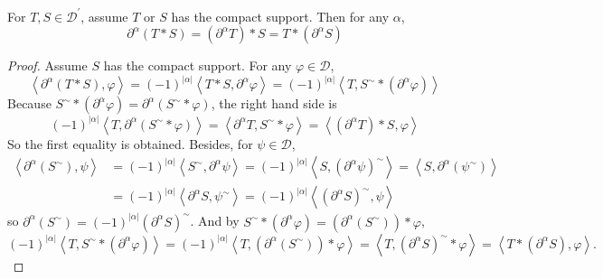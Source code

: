 \begin{enumerate}[label=\arabic*.]
	\begin{prop}
		For $T,S \in \mathcal{D}^\prime$, assume $T$ or $S$ has the compact support. Then for any $\alpha$,
		\begin{equation*}
			\partial^\alpha(T * S)=\left(\partial^\alpha T\right) * S=T *\left(\partial^\alpha S\right)
		\end{equation*}
	\end{prop}
	\begin{proof}
		Assume $S$ has the compact support. For any $\varphi \in \mathcal{D}$,
		\begin{equation*}
			\left\langle\partial^\alpha(T * S), \varphi\right\rangle=(-1)^{|\alpha|}\left\langle T * S, \partial^\alpha \varphi\right\rangle=(-1)^{|\alpha|}\left\langle T, S^{\sim} *\left(\partial^\alpha \varphi\right)\right\rangle
		\end{equation*}
		Because $S^{\sim} *\left(\partial^\alpha \varphi\right)=\partial^\alpha\left(S^{\sim} * \varphi\right)$, the right hand side is
		\begin{equation*}
			(-1)^{|\alpha|}\left\langle T, \partial^\alpha\left(S^{\sim} * \varphi\right)\right\rangle=\left\langle\partial^\alpha T, S^{\sim} * \varphi\right\rangle=\left\langle\left(\partial^\alpha T\right) * S, \varphi\right\rangle
		\end{equation*}
		So the first equality is obtained. Besides, for $\psi \in \mathcal{D}$,
		\begin{equation*}
			\begin{aligned}
				\left\langle\partial^\alpha\left(S^{\sim}\right), \psi\right\rangle & =(-1)^{|\alpha|}\left\langle S^{\sim}, \partial^\alpha \psi\right\rangle=(-1)^{|\alpha|}\left\langle S,\left(\partial^\alpha \psi\right)^{\sim}\right\rangle=\left\langle S, \partial^\alpha\left(\psi^{\sim}\right)\right\rangle \\
				& =(-1)^{|\alpha|}\left\langle\partial^\alpha S, \psi^{\sim}\right\rangle=(-1)^{|\alpha|}\left\langle\left(\partial^\alpha S\right)^{\sim}, \psi\right\rangle
			\end{aligned}
		\end{equation*}
		so $\partial^\alpha\left(S^{\sim}\right)=(-1)^{|\alpha|}\left(\partial^\alpha S\right)^{\sim}$. And by $S^{\sim} *\left(\partial^\alpha \varphi\right)=\left(\partial^\alpha\left(S^{\sim}\right)\right) * \varphi$, 
		\begin{equation*}
			(-1)^{|\alpha|}\left\langle T, S^{\sim} *\left(\partial^\alpha \varphi\right)\right\rangle= (-1)^{|\alpha|}\left\langle T,\left(\partial^\alpha\left(S^{\sim}\right)\right) * \varphi\right\rangle=\left\langle T,\left(\partial^\alpha S\right)^{\sim} * \varphi\right\rangle=\left\langle T *\left(\partial^\alpha S\right), \varphi\right\rangle .
		\end{equation*}
	\end{proof}


\end{enumerate}
